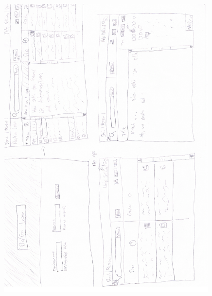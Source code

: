 \begin{figure}
  \vspace{-20pt}
  \begin{center}
    \includegraphics[page=1,width=0.99\textwidth]{./images/entwuerfe/koenig2}
  \end{center}
  \vspace{-40pt}
\end{figure}